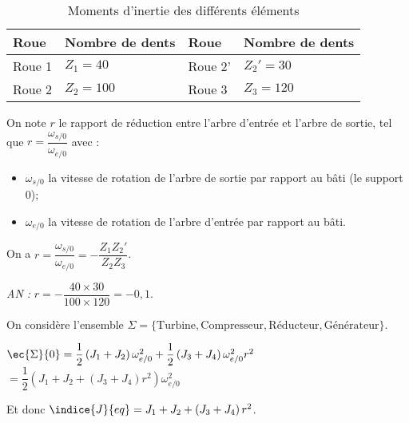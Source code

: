 \begin{table}[!h]
\begin{tabular}{llll}
\hline
Roue & Nombre de dents & Roue & Nombre de dents\\ \hline
Roue 1 		& $Z_1 = 40$ 	& Roue 2' 	& $Z_2' = 30$ 	\\
Roue 2 		& $Z_2 = 100$ 	& Roue 3	& $Z_3 = 120$ 	\\
 \hline
\end{tabular}
\caption{Moments d’inertie des différents éléments \label{tab_94_02}}
 \end{table}

 On note $r$ le rapport de réduction entre l’arbre d’entrée et l’arbre de sortie, tel que $r = \dfrac{\omega_{s/0}}{\omega_{e/0}}$ avec :
\begin{itemize}
 	\item  $\omega_{s/0}$ la vitesse de rotation de l’arbre de sortie par rapport au bâti (le support 0);
 	\item $\omega_{e/0}$ la vitesse de rotation de l’arbre d'entrée par rapport au bâti.
\end{itemize}

\fi


\ifprof
\else
\fi
\begin{corrige}
On a $r = \dfrac{\omega_{s/0}}{\omega_{e/0}} = - \dfrac{Z_1 Z_2'}{Z_2 Z_3} $.

\textit{AN :} $r =  - \dfrac{40 \times 30}{100 \times 120}  = -0,1$.
\end{corrige}

On considère l’ensemble $\Sigma =\{\text{Turbine}, \text{Compresseur}, \text{Réducteur}, \text{Générateur}\}$.

\ifprof 
\else
\fi

\begin{corrige}
$\ec{\Sigma}{0} = \dfrac{1}{2}\left( J_1 + J_2 \right) \omega_{e/0}^2 + \dfrac{1}{2}\left( J_3 + J_4 \right) \omega_{e/0}^2r^2 $
$= \dfrac{1}{2}\left(  J_1 + J_2  + \left( J_3 + J_4 \right)r^2  \right)\omega_{e/0}^2$

Et donc $\indice{J}{eq}= J_1 + J_2  + \left( J_3 + J_4 \right)r^2 $.

\end{corrige}


